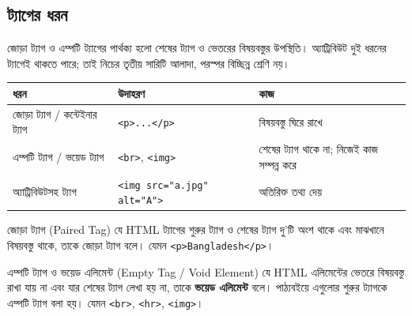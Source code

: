 \subsection{ট্যাগের ধরন}
জোড়া ট্যাগ ও এম্পটি ট্যাগের পার্থক্য হলো শেষের ট্যাগ ও ভেতরের বিষয়বস্তুর উপস্থিতি। অ্যাট্রিবিউট দুই ধরনের ট্যাগেই থাকতে পারে; তাই নিচের তৃতীয় সারিটি আলাদা, পরস্পর বিচ্ছিন্ন শ্রেণি নয়।
\begin{center}
\begin{tabular}{|p{}|p{}|p{}|}
\hline
\textbf{ধরন} & \textbf{উদাহরণ} & \textbf{কাজ} \\
\hline
জোড়া ট্যাগ / কন্টেইনার ট্যাগ & \texttt{<p>...</p>} & বিষয়বস্তু ঘিরে রাখে \\
\hline
এম্পটি ট্যাগ / ভয়েড ট্যাগ & \texttt{<br>}, \texttt{<img>} & শেষের ট্যাগ থাকে না; নিজেই কাজ সম্পন্ন করে \\
\hline
অ্যাট্রিবিউটসহ ট্যাগ & \texttt{<img src="a.jpg" alt="A">} & অতিরিক্ত তথ্য দেয় \\
\hline
\end{tabular}
\end{center}

\begin{definitionbox}{জোড়া ট্যাগ (Paired Tag)}
যে HTML ট্যাগের শুরুর ট্যাগ ও শেষের ট্যাগ দু'টি অংশ থাকে এবং মাঝখানে বিষয়বস্তু থাকে, তাকে জোড়া ট্যাগ বলে। যেমন \texttt{<p>Bangladesh</p>}।
\end{definitionbox}

\begin{definitionbox}{এম্পটি ট্যাগ ও ভয়েড এলিমেন্ট (Empty Tag / Void Element)}
যে HTML এলিমেন্টের ভেতরে বিষয়বস্তু রাখা যায় না এবং যার শেষের ট্যাগ লেখা হয় না, তাকে \textbf{ভয়েড এলিমেন্ট} বলে। পাঠ্যবইয়ে এগুলোর শুরুর ট্যাগকে এম্পটি ট্যাগ বলা হয়। যেমন \texttt{<br>}, \texttt{<hr>}, \texttt{<img>}।
\end{definitionbox}

